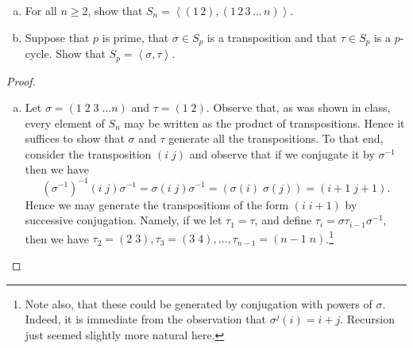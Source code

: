 \documentclass[10pt]{amsart}
\begin{document}
\begin{thm}
  \begin{enumerate}[(a)]
    \item
      For all $n \geq 2$, show that $S_n = \left<(1\, 2), (1\, 2\, 3\, \ldots\, n)\right>$.
    \item
      Suppose that $p$ is prime, that $\sigma \in S_p$ is a transposition and that $\tau \in S_p$ is a $p$-cycle.
      Show that $S_p = \left<\sigma, \tau\right>$.
  \end{enumerate}
  \begin{proof}
    \begin{enumerate}[(a)]
    \item
      Let $\sigma = \left(1\; 2\; 3\; \ldots n\right)$ and $\tau = \left(1\; 2\right)$.
      Observe that, as was shown in class, every element of $S_n$ may be written as the product of transpositions.
      Hence it suffices to show that $\sigma$ and $\tau$ generate all the transpositions.
      To that end, consider the transposition $\left(i\; j\right)$ and observe that if we conjugate it by $\sigma^{-1}$ then we have
      $$\left(\sigma^{-1}\right)^{-1} \left(i\; j\right) \sigma^{-1} = \sigma \left(i\; j\right) \sigma^{-1} = \left(\sigma\left(i\right)\; \sigma\left(j\right)\right) = \left(i+1\; j+1\right).$$
      Hence we may generate the transpositions of the form $\left(i\; i+1\right)$ by successive conjugation.
      Namely, if we let $\tau_1 = \tau$, and define $\tau_i = \sigma\tau_{i-1}\sigma^{-1}$, then we have $\tau_2 = \left(2\; 3\right), \tau_3 = \left(3\; 4\right), \ldots, \tau_{n-1} = \left(n-1\; n\right)$.\footnote[1]{Note also, that these could be generated by conjugation with powers of $\sigma$.  Indeed, it is immediate from the observation that $\sigma^j(i) = i+j$.  Recursion just seemed slightly more natural here.}


\end{enumerate}
\end{proof}
\end{thm}
\end{document}
